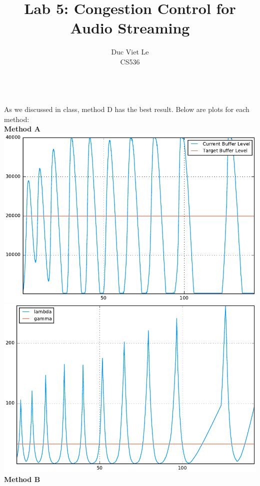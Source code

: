 \documentclass[12pt]{article}
\newenvironment{problem}[2][Problem]{\begin{trivlist}
\item[\hskip \labelsep {\bfseries #1}\hskip \labelsep {\bfseries #2.}]}{\end{trivlist}}
\begin{document}
 
\title{Lab 5: Congestion Control for Audio Streaming}
\author{Duc Viet Le\\
 CS536}
 
\maketitle
 
\begin{problem}{1} \ \\
As we discussed in class, method D has the best result. Below are plots for each method:
\\
\textbf{Method A} \\
\includegraphics[scale = .5]{listen0.pdf}
\includegraphics[scale = .5]{stream0.pdf}
\\
\textbf{Method B} \\

\end{problem}
\end{document}
